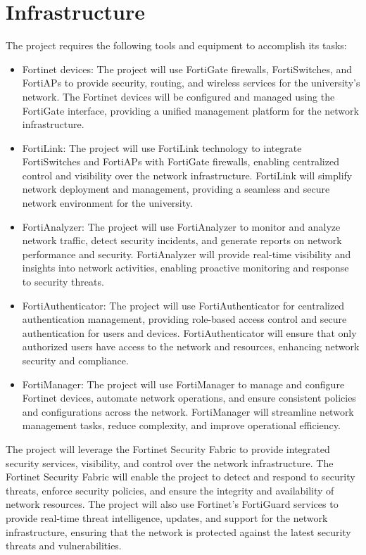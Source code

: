 \documentclass[12pt]{report}
\begin{document}
\section{Infrastructure}
The project requires the following tools and equipment to accomplish its tasks:
\begin{itemize}
    \item Fortinet devices: The project will use FortiGate firewalls, FortiSwitches, and FortiAPs to provide security, routing, and wireless services for the university's network. The Fortinet devices will be configured and managed using the FortiGate interface, providing a unified management platform for the network infrastructure.
    \item FortiLink: The project will use FortiLink technology to integrate FortiSwitches and FortiAPs with FortiGate firewalls, enabling centralized control and visibility over the network infrastructure. FortiLink will simplify network deployment and management, providing a seamless and secure network environment for the university.
    \item FortiAnalyzer: The project will use FortiAnalyzer to monitor and analyze network traffic, detect security incidents, and generate reports on network performance and security. FortiAnalyzer will provide real-time visibility and insights into network activities, enabling proactive monitoring and response to security threats.
    \item FortiAuthenticator: The project will use FortiAuthenticator for centralized authentication management, providing role-based access control and secure authentication for users and devices. FortiAuthenticator will ensure that only authorized users have access to the network and resources, enhancing network security and compliance.
    \item FortiManager: The project will use FortiManager to manage and configure Fortinet devices, automate network operations, and ensure consistent policies and configurations across the network. FortiManager will streamline network management tasks, reduce complexity, and improve operational efficiency.
\end{itemize}
The project will leverage the Fortinet Security Fabric to provide integrated security services, visibility, and control over the network infrastructure. The Fortinet Security Fabric will enable the project to detect and respond to security threats, enforce security policies, and ensure the integrity and availability of network resources. The project will also use Fortinet's FortiGuard services to provide real-time threat intelligence, updates, and support for the network infrastructure, ensuring that the network is protected against the latest security threats and vulnerabilities.
\end{document}
